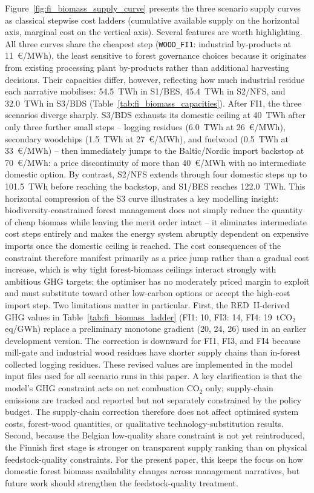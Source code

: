 \documentclass{article}
\begin{document}
Figure~\ref{fig:fi_biomass_supply_curve} presents the three scenario supply curves as classical stepwise cost ladders (cumulative available supply on the horizontal axis, marginal cost on the vertical axis). Several features are worth highlighting. All three curves share the cheapest step (\texttt{WOOD\_FI1}: industrial by-products at 11~€/MWh), the least sensitive to forest governance choices because it originates from existing processing plant by-products rather than additional harvesting decisions. Their capacities differ, however, reflecting how much industrial residue each narrative mobilises: 54.5~TWh in S1/BES, 45.4~TWh in S2/NFS, and 32.0~TWh in S3/BDS (Table~\ref{tab:fi_biomass_capacities}). After FI1, the three scenarios diverge sharply. S3/BDS exhausts its domestic ceiling at 40~TWh after only three further small steps -- logging residues (6.0~TWh at 26~€/MWh), secondary woodchips (1.5~TWh at 27~€/MWh), and fuelwood (0.5~TWh at 33~€/MWh) -- then immediately jumps to the Baltic/Nordic import backstop at 70~€/MWh: a price discontinuity of more than 40~€/MWh with no intermediate domestic option. By contrast, S2/NFS extends through four domestic steps up to 101.5~TWh before reaching the backstop, and S1/BES reaches 122.0~TWh. This horizontal compression of the S3 curve illustrates a key modelling insight: biodiversity-constrained forest management does not simply reduce the quantity of cheap biomass while leaving the merit order intact -- it eliminates intermediate cost steps entirely and makes the energy system abruptly dependent on expensive imports once the domestic ceiling is reached. The cost consequences of the constraint therefore manifest primarily as a price jump rather than a gradual cost increase, which is why tight forest-biomass ceilings interact strongly with ambitious GHG targets: the optimiser has no moderately priced margin to exploit and must substitute toward other low-carbon options or accept the high-cost import step. Two limitations matter in particular. First, the RED~II-derived GHG values in Table~\ref{tab:fi_biomass_ladder} (FI1: 10, FI3: 14, FI4: 19~tCO$_2$eq/GWh) replace a preliminary monotone gradient (20, 24, 26) used in an earlier development version. The correction is downward for FI1, FI3, and FI4 because mill-gate and industrial wood residues have shorter supply chains than in-forest collected logging residues. These revised values are implemented in the model input files used for all scenario runs in this paper. A key clarification is that the model's GHG constraint acts on net combustion CO$_2$ only; supply-chain emissions are tracked and reported but not separately constrained by the policy budget. The supply-chain correction therefore does not affect optimised system costs, forest-wood quantities, or qualitative technology-substitution results. Second, because the Belgian low-quality share constraint is not yet reintroduced, the Finnish first stage is stronger on transparent supply ranking than on physical feedstock-quality constraints. For the present paper, this keeps the focus on how domestic forest biomass availability changes across management narratives, but future work should strengthen the feedstock-quality treatment.
\end{document}
